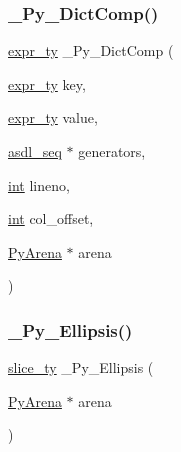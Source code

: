 \subsubsection{\texorpdfstring{\_Py\_DictComp()}{\_Py\_DictComp()}}
{\footnotesize\ttfamily \mbox{\hyperlink{_python-ast_8h_a56d3705e020a071405094a220c4592bd}{expr\+\_\+ty}} \+\_\+\+Py\+\_\+\+Dict\+Comp (\begin{DoxyParamCaption}\item[{\mbox{\hyperlink{_python-ast_8h_a56d3705e020a071405094a220c4592bd}{expr\+\_\+ty}}}]{key,  }\item[{\mbox{\hyperlink{_python-ast_8h_a56d3705e020a071405094a220c4592bd}{expr\+\_\+ty}}}]{value,  }\item[{\mbox{\hyperlink{structasdl__seq}{asdl\+\_\+seq}} $\ast$}]{generators,  }\item[{\mbox{\hyperlink{warnings_8h_a74f207b5aa4ba51c3a2ad59b219a423b}{int}}}]{lineno,  }\item[{\mbox{\hyperlink{warnings_8h_a74f207b5aa4ba51c3a2ad59b219a423b}{int}}}]{col\+\_\+offset,  }\item[{\mbox{\hyperlink{pyarena_8h_a9edeb357fbb27333471022a0975adb7a}{Py\+Arena}} $\ast$}]{arena }\end{DoxyParamCaption})}

\mbox{\label{_python-ast_8h_ad6c8822f22b05c0bf9c10f9952f9fd88}} 
\subsubsection{\texorpdfstring{\_Py\_Ellipsis()}{\_Py\_Ellipsis()}}
{\footnotesize\ttfamily \mbox{\hyperlink{_python-ast_8h_a1aba5288236679e8faff34c189476bf0}{slice\+\_\+ty}} \+\_\+\+Py\+\_\+\+Ellipsis (\begin{DoxyParamCaption}\item[{\mbox{\hyperlink{pyarena_8h_a9edeb357fbb27333471022a0975adb7a}{Py\+Arena}} $\ast$}]{arena }\end{DoxyParamCaption})}

\mbox{\label{_python-ast_8h_a94b7d40f34ae3efcca7c06be95124922}} 
